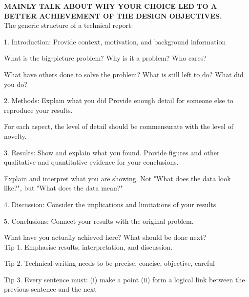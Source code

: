 \newpage

\textbf{MAINLY TALK ABOUT WHY YOUR CHOICE LED TO A BETTER ACHIEVEMENT OF THE DESIGN OBJECTIVES.}\\

The generic structure of a technical report:

1. Introduction: Provide context, motivation, and background information

What is the big-picture problem? Why is it a problem? Who cares?

What have others done to solve the problem? What is still left to do? What did you do?

2. Methods: Explain what you did
Provide enough detail for someone else to reproduce your results.

For each aspect, the level of detail should be commensurate with the level of novelty.

3. Results: Show and explain what you found.
Provide figures and other qualitative and quantitative evidence for your conclusions.

Explain and interpret what you are showing. Not "What does the data look like?", but "What does the data mean?"

4. Discussion: Consider the implications and limitations of your results

5. Conclusions: Connect your results with the original problem.

What have you actually achieved here? What should be done next?\\

Tip 1. Emphasise results, interpretation, and discussion.

Tip 2. Technical writing needs to be precise, concise, objective, careful

Tip 3. Every sentence must: (i) make a point (ii) form a logical link between the previous sentence and the next\\